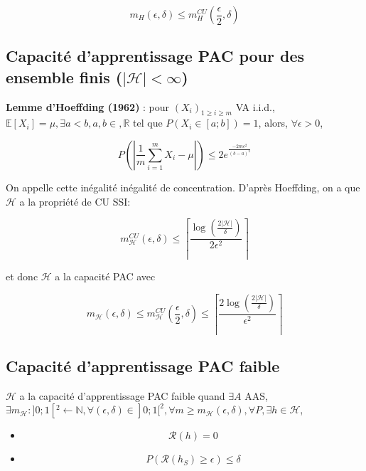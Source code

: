 \begin{equation}
    m_{H}(\epsilon, \delta) \leq m_{H}^{CU}(\frac{\epsilon}{2}, \delta)
\end{equation}

\subsection{Capacité d'apprentissage PAC pour des ensemble finis ($|\mathcal{H}| < \infty$)}

\noindent \textbf{Lemme d'Hoeffding (1962)} : pour $(X_i)_{1 \geq i \geq m}$ VA i.i.d., $\mathbb{E}[X_i] = \mu, \exists a < b, a,b \in, \mathbb{R}$
tel que $P(X_i \in [a;b]) = 1$, alors, $\forall \epsilon > 0$,

\begin{equation} 
    P(| \frac{1}{m}\sum_{i=1}^{m}X_i - \mu|) \leq 2e^{ \frac{-2m\epsilon^2}{(b-a)^2}}
\end{equation}

\noindent On appelle cette inégalité inégalité de concentration. D'après Hoeffding, on a que $\mathcal{H}$ a la propriété de CU SSI:

\begin{equation}
    m_{\mathcal{H}}^{CU}(\epsilon, \delta) \leq 
    \left\lceil \frac{\log\left(\frac{2|\mathcal{H}|}{\delta}\right)}{2\epsilon^2} \right\rceil
\end{equation}

\noindent et donc $\mathcal{H}$ a la capacité PAC avec 

\begin{equation}
    m_{\mathcal{H}}(\epsilon, \delta) \leq 
    m_{\mathcal{H}}^{CU}(\frac{\epsilon}{2}, \delta) \leq
    \left\lceil \frac{2\log(\frac{2|\mathcal{H}|}{\delta})}{\epsilon^2} \right\rceil
\end{equation}

\subsection{Capacité d'apprentissage PAC faible}

\noindent $\mathcal{H}$ a la capacité d'apprentissage PAC faible quand $\exists A$ AAS, $\exists m_{\mathcal{H}} : ]0;1[^2 \leftarrow \mathbb{N},
\forall (\epsilon, \delta) \in ]0;1[^2, \forall  m \geq m_{\mathcal{H}}(\epsilon, \delta), \forall P, \exists h \in \mathcal{H}$,

\begin{itemize}

    \item \begin{equation}
        \mathcal{R}(h)= 0 
    \end{equation}

    \item \begin{equation}
        P(\mathcal{R}(h_S) \geq \epsilon) \leq \delta 
    \end{equation}

\end{itemize}

